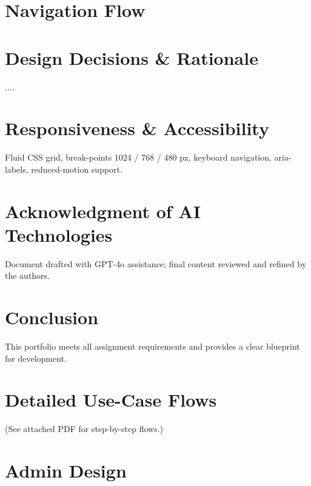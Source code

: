 \documentclass[11pt,a4paper]{article}
\begin{document}
	
	\section{Navigation Flow}\label{sec:navigation-flow}

	\section{Design Decisions \& Rationale}\label{sec:design-decisions-&-rationale}
	....
	\section{Responsiveness \& Accessibility}\label{sec:responsiveness-&-accessibility}
	Fluid CSS grid, break-points 1024 / 768 / 480 px, keyboard navigation, aria-labels, reduced-motion support.
	
	\section{Acknowledgment of AI Technologies}\label{sec:acknowledgment-of-ai-technologies}
	Document drafted with GPT-4o assistance; final content reviewed and refined by the authors.
	
	\section{Conclusion}\label{sec:conclusion}
	This portfolio meets all assignment requirements and provides a clear blueprint for development.
	
	\appendix
	\section{Detailed Use-Case Flows}\label{sec:usecases}
	(See attached PDF for step-by-step flows.)








\section{Admin Design}\label{sec:admin-design}
	\vspace{0.3cm}
\end{document}
